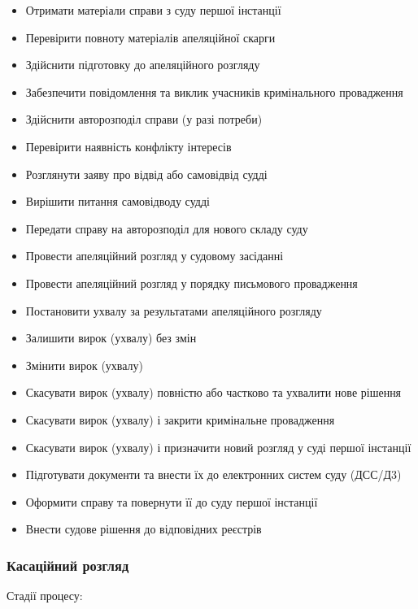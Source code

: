 \documentclass{article}
\begin{document}
\begin{itemize}
    \item Отримати матеріали справи з суду першої інстанції
    \item Перевірити повноту матеріалів апеляційної скарги
    \item Здійснити підготовку до апеляційного розгляду
    \item Забезпечити повідомлення та виклик учасників кримінального провадження
    \item Здійснити авторозподіл справи (у разі потреби)
    \item Перевірити наявність конфлікту інтересів
    \item Розглянути заяву про відвід або самовідвід судді
    \item Вирішити питання самовідводу судді
    \item Передати справу на авторозподіл для нового складу суду
    \item Провести апеляційний розгляд у судовому засіданні
    \item Провести апеляційний розгляд у порядку письмового провадження
    \item Постановити ухвалу за результатами апеляційного розгляду
    \item Залишити вирок (ухвалу) без змін
    \item Змінити вирок (ухвалу)
    \item Скасувати вирок (ухвалу) повністю або частково та ухвалити нове рішення
    \item Скасувати вирок (ухвалу) і закрити кримінальне провадження
    \item Скасувати вирок (ухвалу) і призначити новий розгляд у суді першої інстанції
    \item Підготувати документи та внести їх до електронних систем суду (ДСС/Д3)
    \item Оформити справу та повернути її до суду першої інстанції
    \item Внести судове рішення до відповідних реєстрів
\end{itemize}

\newpage
\subsubsection{Касаційний розгляд}

Стадії процесу:
\end{document}
